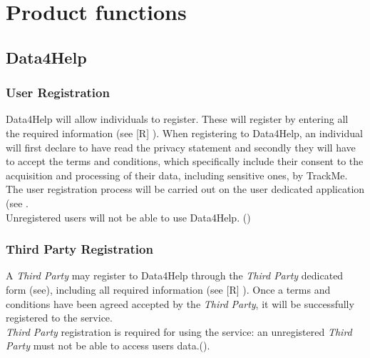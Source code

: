 \documentclass[../../rasd.tex]{subfiles}
\begin{document}
\section{Product functions}
			\subsection{Data4Help}
			
				\subsubsection{User Registration}
				Data4Help will allow individuals to register. These will register by entering all the required information (see [R] ). When registering to Data4Help, an individual will first declare to have read the privacy statement and secondly they will have to accept the terms and conditions, which specifically include their consent to the acquisition and processing of their data, including sensitive ones, by TrackMe.\\
				The user registration process will be carried out on the user dedicated application (see .\\
				Unregistered users will not be able to use Data4Help. ()
			
				\subsubsection{Third Party Registration}
				A \textit{Third Party} may register to Data4Help through the \textit{Third Party} dedicated form (see), including all required information (see [R] ).
				Once a terms and conditions have been agreed accepted by the \textit{Third Party}, it will be successfully registered to the service.\\
				\textit{Third Party} registration is required for using the service: an unregistered \textit{Third Party} must not be able to access users data.().
			
\end{document}
